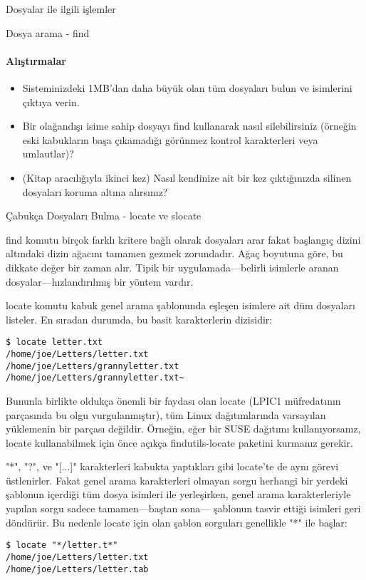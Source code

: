 \begin{section}{Dosyalar ile ilgili işlemler}
\begin{subsection}{Dosya arama - find}
\paragraph{Alıştırmalar}{
\begin{itemize}
 \item Sisteminizdeki 1MB'dan daha büyük olan tüm dosyaları bulun ve isimlerini çıktıya verin.
 \item Bir olağandışı isime sahip dosyayı find kullanarak nasıl silebilirsiniz (örneğin eski kabukların başa çıkamadığı görünmez kontrol karakterleri veya umlautlar)?
 \item (Kitap aracılığıyla ikinci kez) Nasıl kendinize ait bir kez çıktığınızda silinen dosyaları koruma altına alırsınız?
\end{itemize}}
\end{subsection}
\begin{subsection}{Çabukça Dosyaları Bulma - locate ve slocate}

find komutu birçok farklı kritere bağlı olarak dosyaları arar fakat başlangıç dizini altındaki dizin ağacını tamamen gezmek zorundadır. Ağaç boyutuna göre, bu dikkate değer bir zaman alır. Tipik bir uygulamada—belirli isimlerle aranan dosyalar—hızlandırılmış bir yöntem vardır.

locate komutu kabuk genel arama şablonunda eşleşen isimlere ait düm dosyaları listeler. En sıradan durumda, bu basit karakterlerin dizisidir:
\begin{verbatim}
$ locate letter.txt
/home/joe/Letters/letter.txt
/home/joe/Letters/grannyletter.txt
/home/joe/Letters/grannyletter.txt~
\end{verbatim}

Bununla birlikte oldukça önemli bir faydası olan locate (LPIC1 müfredatının parçasında bu olgu vurgulanmıştır), tüm Linux dağıtımlarında varsayılan yüklemenin bir parçası değildir. Örneğin, eğer bir SUSE dağıtımı kullanıyorsanız, locate kullanabilmek için önce açıkça findutils-locate paketini kurmanız gerekir.

"*", "?", ve "[...]" karakterleri kabukta yaptıkları gibi locate'te de aynı görevi üstlenirler. Fakat genel arama karakterleri olmayan sorgu herhangi bir yerdeki şablonun içerdiği tüm dosya isimleri ile yerleşirken, genel arama karakterleriyle yapılan sorgu sadece tamamen—baştan sona— şablonun tasvir ettiği isimleri geri döndürür. Bu nedenle locate için olan şablon sorguları genellikle "*" ile başlar:
\begin{verbatim}
$ locate "*/letter.t*"
/home/joe/Letters/letter.txt
/home/joe/Letters/letter.tab
\end{verbatim}


\end{subsection}
\end{section}
